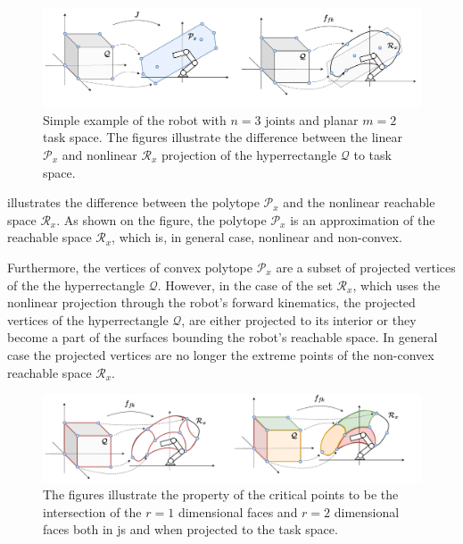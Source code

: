 \begin{figure}[!h]
    \centering
    \includegraphics[width=\textwidth]{Papers/images/curved_space_algo_new.pdf}
    \caption{Simple example of the robot with $n=3$ joints and planar $m=2$ task space. The figures illustrate the difference between the linear $\mathcal{P}_x$ and nonlinear $\mathcal{R}_x$ projection of the hyperrectangle $\mathcal{Q}$ to task space.}
    \label{fig:curved_space_algo_new}
\end{figure}

 illustrates the difference between the polytope $\mathcal{P}_x$ and the nonlinear reachable space $\mathcal{R}_x$. As shown on the figure, the polytope $\mathcal{P}_x$ is an approximation of the reachable space $\mathcal{R}_x$, which is, in general case, nonlinear and non-convex. 

Furthermore, the vertices of convex polytope $\mathcal{P}_x$ are a subset of projected vertices of the the hyperrectangle $\mathcal{Q}$. However, in the case of the set $\mathcal{R}_x$, which uses the nonlinear projection through the robot's forward kinematics, the projected vertices of the hyperrectangle $\mathcal{Q}$, are either projected to its interior or they become a part of the surfaces bounding the robot's reachable space. In general case the projected vertices are no longer the extreme points of the non-convex reachable space $\mathcal{R}_x$. 

\begin{figure}[!h]
    \centering
    \includegraphics[width=\textwidth]{Papers/images/curved_space_algo_new_critical.pdf}
    \caption{The figures illustrate the property of the critical points to be the intersection of the $r=1$ dimensional faces and $r=2$ dimensional faces both in \gls{js} and when projected to the task space.}
    \label{fig:curved_space_algo_new_critical}
\end{figure}

